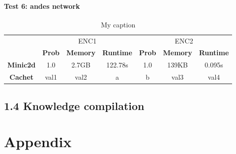 \documentclass[a4paper,10pt]{report}
\begin{document}
\subsubsection{Test 6: andes network}
\begin{table}[H]
\centering
\caption{My caption}
\label{my-label}
\begin{tabular}{c|c|c|c|c|c|c|}
\cline{2-7}
        & \multicolumn{3}{c|}{ENC1} & \multicolumn{3}{c|}{ENC2} \\ \cline{2-7} 
  & \textbf{Prob}  & \textbf{Memory}  & \textbf{Runtime} & \textbf{Prob}  & \textbf{Memory}  & \textbf{Runtime} \\ \cline{1-7} 
  \textbf{Minic2d} & 1.0  & 2.7GB    & 122.78s   & 1.0    & 139KB    & 	0.095s \\
  \hline
\textbf{Cachet}  & val1  & val2    & a       & b     & val3    & val4    \\ \cline{1-7} 
\end{tabular}
\end{table}



\section*{1.4 Knowledge compilation}

\chapter{Appendix}
\end{document}
